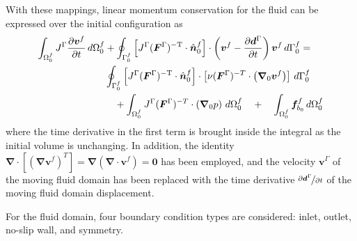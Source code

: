 \documentclass[sn-mathphys,Numbered]{sn-jnl}%
\newcommand{\bb}{\boldsymbol}
\begin{document}
With these mappings, linear momentum conservation for the fluid can be expressed over the initial configuration as
\begin{align} \label{eqn:momentum_fluid_deformed}
\int_{\Omega^f_0} J^\Gamma \frac{\partial \bb{v}^f}{\partial t} \, d\Omega^f_0
	&+ \oint_{\Gamma^f_0}  \left[ J^\Gamma (\bb{F}^\Gamma)^{-\text{T}} \cdot \hat{\bb{n}}_0^f \right] \cdot \left(\bb{v}^f - \frac{\partial \bb{d}^\Gamma}{\partial t}\right) \bb{v}^f \, d\Gamma^f_0 = \notag \\
	&\oint_{\Gamma^f_0}  \left[ J^\Gamma (\bb{F}^\Gamma)^{-\text{T}} \cdot \hat{\bb{n}}_0^f \right]
	\cdot \left[\nu (\bb{F}^\Gamma)^{-T} \cdot \left( \bb{\nabla}_0 \bb{v}^f \right) \right] \, d\Gamma^f_0 \notag \\
	&\quad + \int_{\Omega^f_0} J^\Gamma (\bb{F}^\Gamma)^{-T} \cdot \left( \bb{\nabla}_0 p \right) \, d\Omega^f_0
\quad+\quad \int_{\Omega^f_0} \bb{f}_{b_0}^f \, d\Omega^f_0
\end{align}
where the time derivative in the first term is brought inside the integral as the initial volume is unchanging.
In addition, the identity
$\bb{\nabla} \cdot \left[ \left(\bb{\nabla} \bb{v}^f \right)^T \right] = \bb{\nabla} \left( \bb{\nabla} \cdot \bb{v}^f \right) = \bb{0}$ has been employed, and the velocity $\bb{v}^\Gamma$ of the moving fluid domain has been replaced with the time derivative $\nicefrac{\partial \bb{d}^\Gamma}{\partial t}$ of the moving fluid domain displacement.

For the fluid domain, four boundary condition types are considered: inlet, outlet, no-slip wall, and symmetry.


\end{document}
